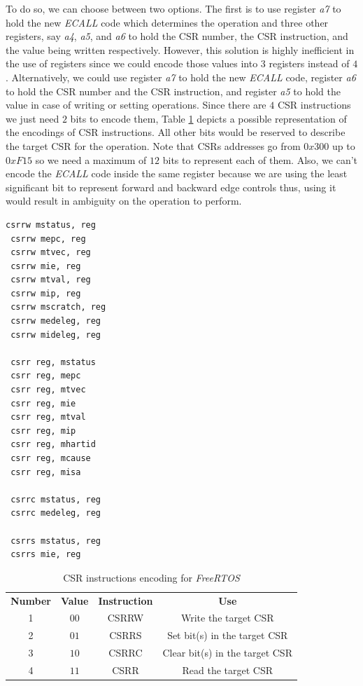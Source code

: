 To do so, we can choose between two options. The first is to use register \textit{a7}
to hold the new \textit{ECALL} code which determines the operation and three other
registers, say \textit{a4}, \textit{a5}, and \textit{a6} to hold the CSR number,
the CSR instruction, and the value being written respectively. However, this solution
is highly inefficient in the use of registers since we could encode those values
into $3$ registers instead of $4$. Alternatively, we could use register \textit{a7}
to hold the new \textit{ECALL} code, register \textit{a6} to hold the CSR number
and the CSR instruction, and register \textit{a5} to hold the value in case of writing
or setting operations. Since there are $4$ CSR instructions we just need $2$
bits to encode them, Table \ref{tab:instructionenc} depicts a possible representation
of the encodings of CSR instructions. All other bits would be reserved to
describe the target CSR for the operation. Note that CSRs addresses go from $0x30
0$ up to $0xF15$ so we need a maximum of $12$ bits to represent each of them.
Also, we can't encode the \textit{ECALL} code inside the same register because
we are using the least significant bit to represent forward and backward edge
controls thus, using it would result in ambiguity on the operation to perform.
\\
\begin{lstlisting}[style=Assembly, caption = \textit{FreeRTOS} operations on Control and Status Registers, label={lst:freeoperations}]
 csrrw mstatus, reg
 csrrw mepc, reg
 csrrw mtvec, reg
 csrrw mie, reg
 csrrw mtval, reg
 csrrw mip, reg
 csrrw mscratch, reg
 csrrw medeleg, reg
 csrrw mideleg, reg

 csrr reg, mstatus
 csrr reg, mepc
 csrr reg, mtvec
 csrr reg, mie
 csrr reg, mtval
 csrr reg, mip
 csrr reg, mhartid
 csrr reg, mcause
 csrr reg, misa

 csrrc mstatus, reg
 csrrc medeleg, reg

 csrrs mstatus, reg
 csrrs mie, reg
\end{lstlisting}

\begin{table}
  \centering
  \begin{tabular}{|c|c|c|c|}
    \hline
    \textbf{Number} & \textbf{Value} & \textbf{Instruction} & \textbf{Use}                   \\
    \hhline{====} 1 & $00$           & CSRRW                & Write the target CSR           \\
    \hline
    2               & $01$           & CSRRS                & Set bit(s) in the target CSR   \\
    \hline
    3               & $10$           & CSRRC                & Clear bit(s) in the target CSR \\
    \hline
    4               & $11$           & CSRR                 & Read the target CSR            \\
    \hline
  \end{tabular}
  \caption{CSR instructions encoding for \textit{FreeRTOS}}
  \label{tab:instructionenc}
\end{table}

